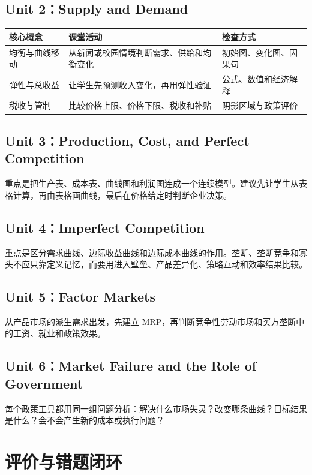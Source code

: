 \documentclass[11pt,a4paper]{ctexart}
\begin{document}
\subsection{Unit 2：Supply and Demand}

\begin{tabularx}{\textwidth}{p{2.8cm}YY}
\toprule
核心概念 & 课堂活动 & 检查方式\\
\midrule
均衡与曲线移动 & 从新闻或校园情境判断需求、供给和均衡变化 & 初始图、变化图、因果句\\
弹性与总收益 & 让学生先预测收入变化，再用弹性验证 & 公式、数值和经济解释\\
税收与管制 & 比较价格上限、价格下限、税收和补贴 & 阴影区域与政策评价\\
\bottomrule
\end{tabularx}

\subsection{Unit 3：Production, Cost, and Perfect Competition}

重点是把生产表、成本表、曲线图和利润图连成一个连续模型。建议先让学生从表格计算，再由表格画曲线，最后在价格给定时判断企业决策。

\subsection{Unit 4：Imperfect Competition}

重点是区分需求曲线、边际收益曲线和边际成本曲线的作用。垄断、垄断竞争和寡头不应只靠定义记忆，而要用进入壁垒、产品差异化、策略互动和效率结果比较。

\subsection{Unit 5：Factor Markets}

从产品市场的派生需求出发，先建立 MRP，再判断竞争性劳动市场和买方垄断中的工资、就业和政策效果。

\subsection{Unit 6：Market Failure and the Role of Government}

每个政策工具都用同一组问题分析：解决什么市场失灵？改变哪条曲线？目标结果是什么？会不会产生新的成本或执行问题？

\section{评价与错题闭环}
\end{document}
